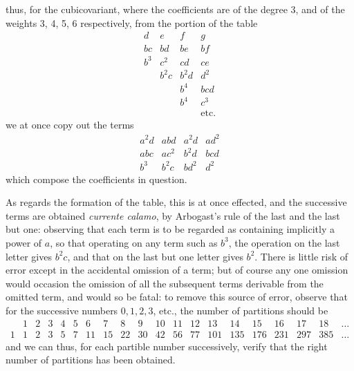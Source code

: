 \documentclass[11pt,a4paper]{article}
\begin{document}
\newpage
\noindent
thus, for the cubicovariant, where the coefficients are of the degree 3, and of the weights 3, 4, 5, 6 respectively, from the portion of the table
\[
  \begin{array}{cccc}
    d  & e  & f  & g  \\
    bc & bd & be & bf \\
    b^{3} & c^{2} & cd & ce \\
       & b^{2}c & b^{2}d & d^{2} \\
       &        & b^{4}  & bcd \\
       &        & b^{4}  & c^{3} \\
       &        &        & \text{etc.}
  \end{array}
\]
we at once copy out the terms
\[
  \begin{array}{cccc}
    a^{2}d & abd & a^{2}d & ad^{2} \\
    abc    & ac^{2} & b^{2}d & bcd \\
    b^{3}  & b^{2}c & bd^{2} & d^{2}
  \end{array}
\]
which compose the coefficients in question.

As regards the formation of the table, this is at once effected, and the successive terms are obtained \textit{currente calamo}, by Arbogast's rule of the last and the last but one: observing that each term is to be regarded as containing implicitly a power of $a$, so that operating on any term such as $b^{3}$, the operation on the last letter gives $b^{2}c$, and that on the last but one letter gives $b^{2}$. There is little risk of error except in the accidental omission of a term; but of course any one omission would occasion the omission of all the subsequent terms derivable from the omitted term, and would so be fatal: to remove this source of error, observe that for the successive numbers $0,1,2,3$, etc., the number of partitions should be
\[
  \begin{array}{cccccccccccccccccccc}
    & 1 & 2 & 3 & 4 & 5 & 6 & 7 & 8 & 9 & 10 & 11 & 12 & 13 & 14 & 15 & 16 & 17 & 18 & \ldots \\
   1 & 1 & 2 & 3 & 5 & 7 & 11 & 15 & 22 & 30 & 42 & 56 & 77 & 101 & 135 & 176 & 231 & 297 & 385 & \ldots
  \end{array}
\]
and we can thus, for each partible number successively, verify that the right number of partitions has been obtained.
\end{document}
